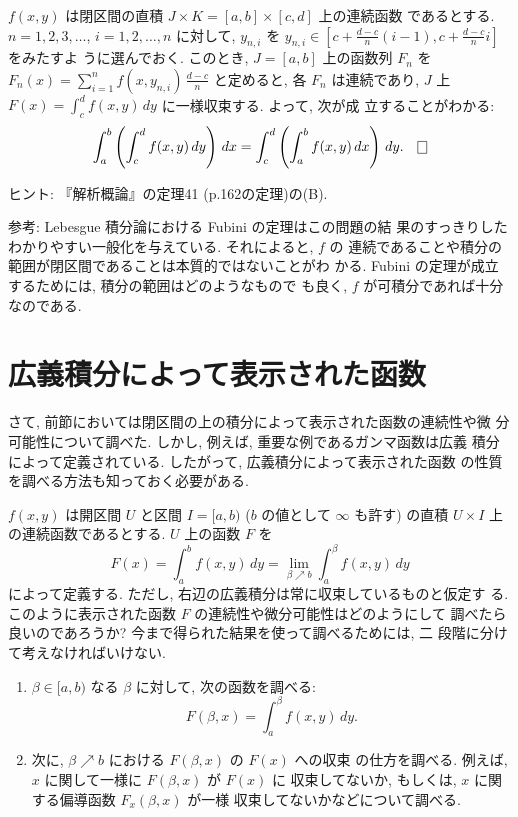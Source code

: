 \documentclass[12pt,twoside]{jarticle}
\begin{document}
\begin{question}[二重積分の順序の交換]
  $f(x,y)$ は閉区間の直積 $J\times K = [a,b]\times[c,d]$ 上の連続函数
  であるとする. $n=1,2,3,\ldots$, $i=1,2,\dots,n$ に対して, $y_{n,i}$ %
  を $y_{n,i} \in [c+\frac{d-c}{n}(i-1), c+\frac{d-c}{n}i]$ をみたすよ
  うに選んでおく. このとき, $J=[a,b]$ 上の函数列 $F_n$ を %
  \( \displaystyle
    F_n(x) = \sum_{i=1}^{n} f(x, y_{n,i}) \,\frac{d-c}{n}
  \) %
  と定めると, 各 $F_n$ は連続であり, %
  $J$ 上 $F(x) = \int_c^d f(x,y) \,dy$ に一様収束する. よって, 次が成
  立することがわかる:
  \[
    \int_a^b \left( \int_c^d f(x,y) \,dy \right) \,dx
    =
    \int_c^d \left( \int_a^b f(x,y) \,dx \right) \,dy.
  \qed
  \]
\end{question}

\noindent ヒント: 『解析概論』の定理41 (p.162の定理)の(B).

\begin{small}
  \noindent 参考: Lebesgue 積分論における Fubini の定理はこの問題の結
  果のすっきりしたわかりやすい一般化を与えている. それによると, $f$ の
  連続であることや積分の範囲が閉区間であることは本質的ではないことがわ
  かる. Fubini の定理が成立するためには, 積分の範囲はどのようなもので
  も良く, $f$ が可積分であれば十分なのである.
\end{small}


\section{広義積分によって表示された函数}

さて, 前節においては閉区間の上の積分によって表示された函数の連続性や微
分可能性について調べた. しかし, 例えば, 重要な例であるガンマ函数は広義
積分によって定義されている. したがって, 広義積分によって表示された函数
の性質を調べる方法も知っておく必要がある.

$f(x,y)$ は開区間 $U$ と区間 $I=[a,b)$ ($b$ の値として $\infty$ も許す)
の直積 $U\times I$ 上の連続函数であるとする. $U$ 上の函数 $F$ を
\[
  F(x)
  = \int_a^b f(x,y)\,dy
  = \lim_{\beta\nearrow b} \int_a^\beta f(x,y)\,dy
\]
によって定義する. ただし, 右辺の広義積分は常に収束しているものと仮定す
る. このように表示された函数 $F$ の連続性や微分可能性はどのようにして
調べたら良いのであろうか? 今まで得られた結果を使って調べるためには, 二
段階に分けて考えなければいけない.
\begin{enumerate}
\item $\beta \in [a,b)$ なる $\beta$ に対して, 次の函数を調べる:
  \[%
    F(\beta,x) = \int_a^\beta f(x,y)\,dy.
  \]%
\item 次に, $\beta\nearrow b$ における $F(\beta,x)$ の $F(x)$ への収束
  の仕方を調べる. 例えば, $x$ に関して一様に $F(\beta,x)$ が $F(x)$ に
  収束してないか, もしくは, $x$ に関する偏導函数 $F_x(\beta,x)$ が一様
  収束してないかなどについて調べる.
\end{enumerate}
\end{document}
